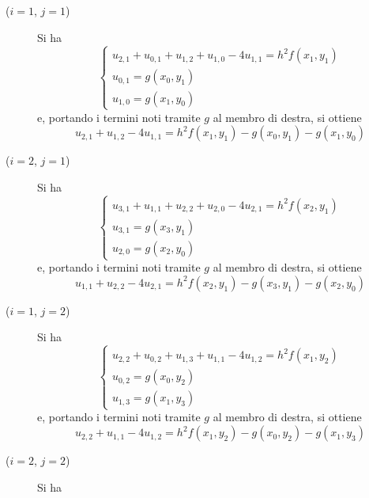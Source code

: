 \begin{esempio}
		\begin{description}
			\item[(\(i = 1\), \(j = 1\))] Si ha
			\begin{equation*}
				\begin{cases*}
					u_{2, 1} + u_{0, 1} + u_{1, 2} + u_{1, 0} - 4 u_{1, 1} = h^2 f (x_1, y_1) \\
					u_{0, 1} = g (x_0, y_1) \\
					u_{1, 0} = g (x_1, y_0)
				\end{cases*}
			\end{equation*}
			e, portando i termini noti tramite \(g\) al membro di destra, si ottiene
			\begin{equation*}
				u_{2, 1} + u_{1, 2} - 4 u_{1, 1} = h^2 f (x_1, y_1) - g (x_0, y_1) - g (x_1, y_0)
			\end{equation*}
			\item[(\(i = 2\), \(j = 1\))] Si ha
			\begin{equation*}
				\begin{cases*}
					u_{3, 1} + u_{1, 1} + u_{2, 2} + u_{2, 0} - 4 u_{2, 1} = h^2 f (x_2, y_1) \\
					u_{3, 1} = g (x_3, y_1) \\
					u_{2, 0} = g (x_2, y_0)
				\end{cases*}
			\end{equation*}
			e, portando i termini noti tramite \(g\) al membro di destra, si ottiene
			\begin{equation*}
				u_{1, 1} + u_{2, 2} - 4 u_{2, 1} = h^2 f (x_2, y_1) - g (x_3, y_1) - g (x_2, y_0)
			\end{equation*}
			\item[(\(i = 1\), \(j = 2\))] Si ha
			\begin{equation*}
				\begin{cases*}
					u_{2, 2} + u_{0, 2} + u_{1, 3} + u_{1, 1} - 4 u_{1, 2} = h^2 f (x_1, y_2) \\
					u_{0, 2} = g (x_0, y_2) \\
					u_{1, 3} = g (x_1, y_3)
				\end{cases*}
			\end{equation*}
			e, portando i termini noti tramite \(g\) al membro di destra, si ottiene
			\begin{equation*}
				u_{2, 2} + u_{1, 1} - 4 u_{1, 2} = h^2 f (x_1, y_2) - g (x_0, y_2) - g (x_1, y_3)
			\end{equation*}
			\item[(\(i = 2\), \(j = 2\))] Si ha

\end{description}
\end{esempio}
